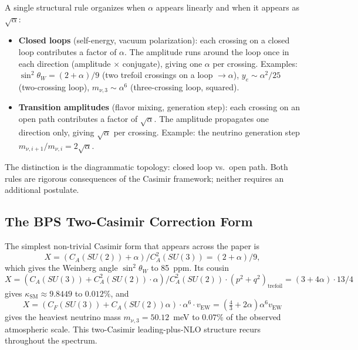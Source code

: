 \documentclass[11pt]{article}
\newcommand{\CA}{C_A}
\newcommand{\CF}{C_F}
\newcommand{\ksm}{\kappa_\text{SM}}
\begin{document}
A single structural rule organizes when $\alpha$ appears linearly
and when it appears as $\sqrt{\alpha}$:

\begin{itemize}
\item
  \textbf{Closed loops} (self-energy, vacuum polarization): each
  crossing on a closed loop contributes a factor of $\alpha$.
  The amplitude runs around the loop once in each direction
  (amplitude $\times$ conjugate), giving one $\alpha$ per
  crossing.  Examples: $\sin^2\theta_W = (2+\alpha)/9$ (two
  trefoil crossings on a loop $\to \alpha$), $y_e \sim \alpha^2/25$
  (two-crossing loop), $m_{\nu,3} \sim \alpha^6$ (three-crossing
  loop, squared).
\item
  \textbf{Transition amplitudes} (flavor mixing, generation step):
  each crossing on an open path contributes a factor of
  $\sqrt{\alpha}$.  The amplitude propagates one direction only,
  giving $\sqrt{\alpha}$ per crossing.  Example: the neutrino
  generation step $m_{\nu,i+1}/m_{\nu,i} = 2\sqrt{\alpha}$.
\end{itemize}

The distinction is the diagrammatic topology: closed loop vs.\ open
path.  Both rules are rigorous consequences of the Casimir
framework; neither requires an additional postulate.

\subsection{The BPS Two-Casimir Correction Form}

The simplest non-trivial Casimir form that appears across
the paper is
\begin{equation}
  X = (\CA(SU(2)) + \alpha)/\CA^2(SU(3)) = (2+\alpha)/9,
\end{equation}
which gives the Weinberg angle $\sin^2\theta_W$ to 85~ppm.  Its
cousin
\begin{equation}
  X = (\CA(SU(3)) + \CA^2(SU(2))\cdot\alpha) / \CA^2(SU(2))
    \cdot (p^2+q^2)_\text{trefoil}
    = (3+4\alpha)\cdot 13/4
\end{equation}
gives $\ksm \approx 9.8449$ to $0.012\%$, and
\begin{equation}
  X = (\CF(SU(3)) + \CA(SU(2))\alpha)\cdot\alpha^6 \cdot v_\text{EW}
    = (\tfrac{4}{3} + 2\alpha)\alpha^6 v_\text{EW}
\end{equation}
gives the heaviest neutrino mass $m_{\nu,3} = 50.12$~meV to
$0.07\%$ of the observed atmospheric scale.  This two-Casimir
leading-plus-NLO structure recurs throughout the spectrum.
\end{document}
